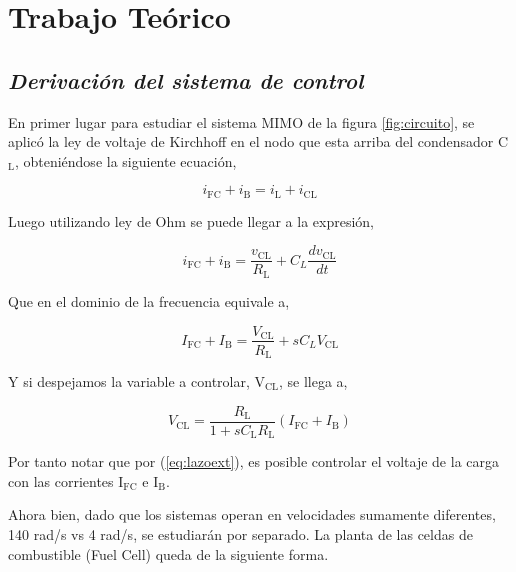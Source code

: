\section{Trabajo Teórico}

\subsection{\textit{Derivación del sistema de control}}

En primer lugar para estudiar el sistema MIMO de la figura \ref{fig:circuito}, se aplicó la ley de voltaje de Kirchhoff en el nodo que esta arriba del condensador C$_{\text{L}}$, obteniéndose la siguiente ecuación,

\begin{equation}
    i_{\text{FC}} + i_{\text{B}} = i_{\text{L}} + i_{\text{CL}}
\end{equation}

Luego utilizando ley de Ohm se puede llegar a la expresión,

\begin{equation}
    i_{\text{FC}} + i_{\text{B}} = \frac{v_{\text{CL}}}{R_{\text{L}}} + C_{L}\frac{dv_{\text{CL}}}{dt}
\end{equation}

Que en el dominio de la frecuencia equivale a,

\begin{equation}
    I_{\text{FC}} + I_{\text{B}} = \frac{V_{\text{CL}}}{R_{\text{L}}} + sC_{L}V_{\text{CL}}
\end{equation}

Y si despejamos la variable a controlar, V$_{\text{CL}}$, se llega a,

\begin{equation}
    V_{\text{CL}} = \frac{R_{\text{L}}}{1+sC_{\text{L}}R_{\text{L}}}(I_{\text{FC}}+I_{\text{B}})
    \label{eq:lazoext}
\end{equation}

Por tanto notar que por (\ref{eq:lazoext}), es posible controlar el voltaje de la carga con las corrientes I$_{\text{FC}}$ e I$_{\text{B}}$.

Ahora bien, dado que los sistemas operan en velocidades sumamente diferentes, 140 rad/s vs 4 rad/s, se estudiarán por separado. La planta de las celdas de combustible (Fuel Cell) queda de la siguiente forma.

\begin{center}
\end{center}

